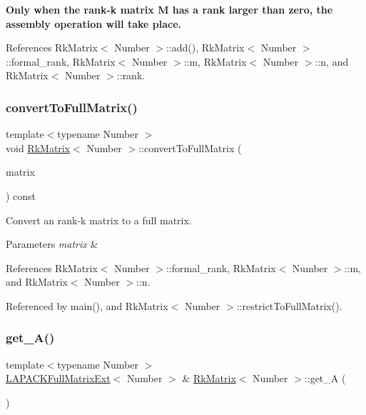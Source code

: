 {\bfseries Only when the rank-\/k matrix {\ttfamily M} has a rank larger than zero, the assembly operation will take place.}

References Rk\+Matrix$<$ Number $>$\+::add(), Rk\+Matrix$<$ Number $>$\+::formal\+\_\+rank, Rk\+Matrix$<$ Number $>$\+::m, Rk\+Matrix$<$ Number $>$\+::n, and Rk\+Matrix$<$ Number $>$\+::rank.

\mbox{\label{classRkMatrix_a384cdf3033d98f90b80d373add20b556}} 
\subsubsection{\texorpdfstring{convert\+To\+Full\+Matrix()}{convertToFullMatrix()}}
{\footnotesize\ttfamily template$<$typename Number $>$ \\
void \hyperlink{classRkMatrix}{Rk\+Matrix}$<$ Number $>$\+::convert\+To\+Full\+Matrix (\begin{DoxyParamCaption}\item[{\hyperlink{classLAPACKFullMatrixExt}{L\+A\+P\+A\+C\+K\+Full\+Matrix\+Ext}$<$ Number $>$ \&}]{matrix }\end{DoxyParamCaption}) const}

Convert an rank-\/k matrix to a full matrix. 
\begin{DoxyParams}{Parameters}
{\em matrix} & \\
\hline
\end{DoxyParams}


References Rk\+Matrix$<$ Number $>$\+::formal\+\_\+rank, Rk\+Matrix$<$ Number $>$\+::m, and Rk\+Matrix$<$ Number $>$\+::n.



Referenced by main(), and Rk\+Matrix$<$ Number $>$\+::restrict\+To\+Full\+Matrix().

\mbox{\label{classRkMatrix_accfea435fd26c622e491bee475ae788c}} 
\subsubsection{\texorpdfstring{get\+\_\+\+A()}{get\_A()}\hspace{0.1cm}{\footnotesize\ttfamily [1/2]}}
{\footnotesize\ttfamily template$<$typename Number $>$ \\
\hyperlink{classLAPACKFullMatrixExt}{L\+A\+P\+A\+C\+K\+Full\+Matrix\+Ext}$<$ Number $>$ \& \hyperlink{classRkMatrix}{Rk\+Matrix}$<$ Number $>$\+::get\+\_\+A (\begin{DoxyParamCaption}{ }\end{DoxyParamCaption})}

